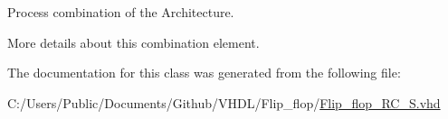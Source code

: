 Process combination of the Architecture. 

More details about this combination element. 

The documentation for this class was generated from the following file\+:\begin{DoxyCompactItemize}
\item 
C\+:/\+Users/\+Public/\+Documents/\+Github/\+V\+H\+D\+L/\+Flip\+\_\+flop/\hyperlink{_flip__flop___r_c___s_8vhd}{Flip\+\_\+flop\+\_\+\+R\+C\+\_\+\+S.\+vhd}\end{DoxyCompactItemize}
